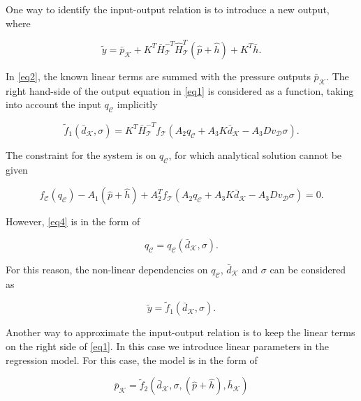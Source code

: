 One way to identify the input-output relation is to introduce a new output, where

\begin{equation}
  \label{eq2}
  \tilde{y} =  \bar{p}_{\mathcal{K}} +  K^T\bar{H}^{-T}_{\mathcal{T}}\hat{H}^{T}_{\mathcal{T}} (\hat{p} + \hat{h}) + K^T\bar{h}.
\end{equation}

In \eqref{eq2}, the known linear terms are summed with the pressure outputs $\bar{p}_{\mathcal{K}}$. The right hand-side of the output equation in \eqref{eq1} is considered as a function, taking into account the input $q_\mathcal{C}$ implicitly

\begin{equation}
  \label{eq3}
  \tilde{f}_1(\bar{d}_{\mathcal{K}}, \sigma) =  K^T \bar{H}^{-T}_{\mathcal{T}}f_{\mathcal{T}}(A_2 q_\mathcal{C} + A_3 K \bar{d}_{\mathcal{K}} - A_3 D v_{\mathcal{D}} \sigma).
\end{equation}

The constraint for the system is on $q_\mathcal{C}$, for which analytical solution cannot be given

 \begin{equation}
\label{eq4}
f_{\mathcal{C}}(q_\mathcal{C}) - A_1(\hat{p} + \hat{h}) + A_2^T f_{\mathcal{T}}(A_2 q_\mathcal{C} + A_3 K \bar{d}_{\mathcal{K}} - A_3 D v_{\mathcal{D}} \sigma) = 0.
\end{equation} 

However, \eqref{eq4} is in the form of

 \begin{equation}
\label{eq5}
q_\mathcal{C} = q_\mathcal{C}(\bar{d}_{\mathcal{K}}, \sigma) .
\end{equation} 

For this reason, the non-linear dependencies on $q_\mathcal{C}$, $\bar{d}_{\mathcal{K}}$ and $\sigma$ can be considered as

 \begin{equation}
\label{eq6}
\tilde{y} = \tilde{f}_1(\bar{d}_{\mathcal{K}}, \sigma).
\end{equation} 

Another way to approximate the input-output relation is to keep the linear terms on the right side of \eqref{eq1}. In this case we introduce linear parameters in the regression model. For this case, the model is in the form of 

\begin{equation}
\label{eq7}
\bar{p}_{\mathcal{K}} = \tilde{f}_2(\bar{d}_{\mathcal{K}}, \sigma, (\hat{p} + \hat{h}), \bar{h}_{\mathcal{K}})
\end{equation} 

